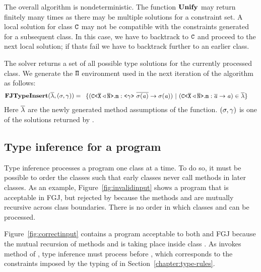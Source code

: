 \documentclass[a4paper,USenglish,cleveref, autoref, thm-restate, anonymous]{lipics-v2021}
\begin{document}
The overall algorithm is nondeterministic. The function $\textbf{Unify}{}$ may
return finitely many times as there may be multiple solutions for a constraint
set.  A local solution for class ${\tt C}$ may not
be compatible with the constraints generated for a subsequent class. In this case, we have to backtrack to ${\tt C}$ and proceed to the next
local solution; if thats fail we have to backtrack further to an earlier class.


The solver \unify{} returns a set of all possible type solutions for the currently processed class.
We generate the ${\tt \Pi}$ environment used in the next iteration of the \fjtype{} algorithm as follows:
\begin{align*}
  \fjtypeInsert{}(\overline{\methodAssumption}, (\sigma, \unifyGenerics{})) & = \begin{array}{l}
    \set{(\exptype{C}{\ol{X} \triangleleft \ol{N}}.\mv{m} : \exptype{}{\unifyGenerics{}}\ \ol{\sigma(\tv{a})} \to \sigma(\tv{a})) \ |\ (\exptype{C}{\ol{X} \triangleleft \ol{N}}.\mv{m} : \ol{\tv{a}} \to \tv{a}) \in \overline{\methodAssumption}}
  \end{array} 
\end{align*}
Here $\overline{\mathtt{\lambda}}$ are the newly generated method assumptions of the \fjtype{} function.
$(\sigma, \gamma{})$ is one of the solutions returned by \unify{}.
\fi

\subsection{Type inference for a program }
\label{sec:proc-mult-class}

{Type inference processes a program one class at a time.
To do so, it must be possible to order the classes such that early
classes never call methods in later classes.
As an example, Figure~\ref{fig:invalidinput} shows a program that is
acceptable in FGJ, but rejected by \TFGJ because the methods 
and  are mutually recursive across class boundaries. There is
no order in which classes  and  can be processed.

Figure~\ref{fig:correctinput} contains a program
acceptable to both \TFGJ and FGJ because the mutual recursion of
methods  and  is taking place inside class . As
 invokes method  of , type inference must process
 before , which corresponds to the constraints imposed
by the typing of \TFGJ in Section~\ref{chapter:type-rules}.}
\end{document}
